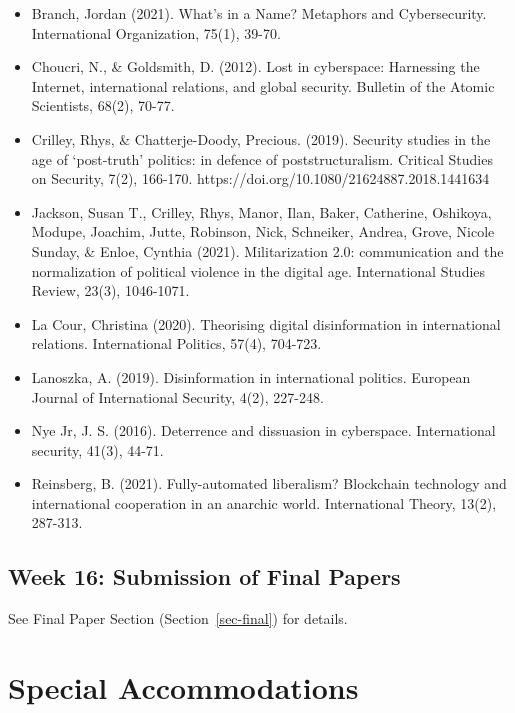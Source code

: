 \documentclass[
  letterpaper,
  DIV=11,
  numbers=noendperiod]{scrartcl}
\providecommand{\tightlist}{%
  \setlength{\itemsep}{0pt}\setlength{\parskip}{0pt}}\usepackage{longtable,booktabs,array}
\begin{document}
\begin{itemize}
\tightlist
\item
  Branch, Jordan (2021). What's in a Name? Metaphors and Cybersecurity.
  International Organization, 75(1), 39-70.
\item
  Choucri, N., \& Goldsmith, D. (2012). Lost in cyberspace: Harnessing
  the Internet, international relations, and global security. Bulletin
  of the Atomic Scientists, 68(2), 70-77.
\item
  Crilley, Rhys, \& Chatterje-Doody, Precious. (2019). Security studies
  in the age of `post-truth' politics: in defence of poststructuralism.
  Critical Studies on Security, 7(2), 166-170.
  https://doi.org/10.1080/21624887.2018.1441634
\item
  Jackson, Susan T., Crilley, Rhys, Manor, Ilan, Baker, Catherine,
  Oshikoya, Modupe, Joachim, Jutte, Robinson, Nick, Schneiker, Andrea,
  Grove, Nicole Sunday, \& Enloe, Cynthia (2021). Militarization 2.0:
  communication and the normalization of political violence in the
  digital age. International Studies Review, 23(3), 1046-1071.
\item
  La Cour, Christina (2020). Theorising digital disinformation in
  international relations. International Politics, 57(4), 704-723.
\item
  Lanoszka, A. (2019). Disinformation in international politics.
  European Journal of International Security, 4(2), 227-248.
\item
  Nye Jr, J. S. (2016). Deterrence and dissuasion in cyberspace.
  International security, 41(3), 44-71.
\item
  Reinsberg, B. (2021). Fully-automated liberalism? Blockchain
  technology and international cooperation in an anarchic world.
  International Theory, 13(2), 287-313.
\end{itemize}

\hypertarget{week-16-submission-of-final-papers}{%
\subsection*{Week 16: Submission of Final
Papers}\label{week-16-submission-of-final-papers}}

See Final Paper Section (Section~\ref{sec-final}) for details.

\hypertarget{special-accommodations}{%
\section{\texorpdfstring{{Special
Accommodations}}{Special Accommodations}}\label{special-accommodations}}
\end{document}
